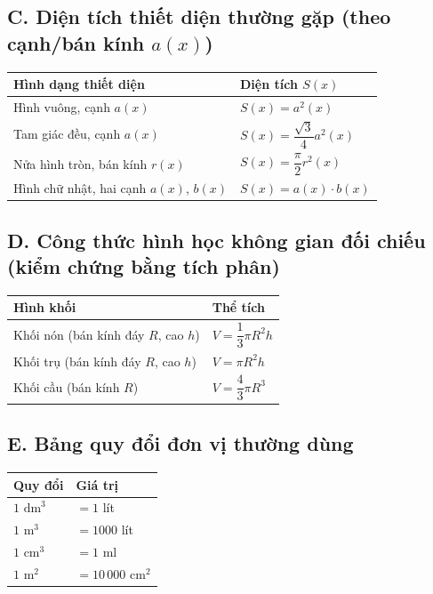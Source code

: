 \subsection*{C. Diện tích thiết diện thường gặp (theo cạnh/bán kính $a(x)$)}

\begin{hopdinhly}
\renewcommand{\arraystretch}{1.8}
\begin{tabular}{>{\raggedright\arraybackslash}p{5.5cm}>{\raggedright\arraybackslash}p{7.5cm}}
\textbf{Hình dạng thiết diện} & \textbf{Diện tích $S(x)$} \\
\hline
Hình vuông, cạnh $a(x)$ & $S(x)=a^2(x)$ \\
Tam giác đều, cạnh $a(x)$ & $S(x)=\dfrac{\sqrt3}{4}a^2(x)$ \\
Nửa hình tròn, bán kính $r(x)$ & $S(x)=\dfrac{\pi}{2}r^2(x)$ \\
Hình chữ nhật, hai cạnh $a(x)$, $b(x)$ & $S(x)=a(x)\cdot b(x)$ \\
\end{tabular}
\end{hopdinhly}

\subsection*{D. Công thức hình học không gian đối chiếu (kiểm chứng bằng tích phân)}

\begin{hopdinhly}
\renewcommand{\arraystretch}{1.8}
\begin{tabular}{>{\raggedright\arraybackslash}p{5.5cm}>{\raggedright\arraybackslash}p{7.5cm}}
\textbf{Hình khối} & \textbf{Thể tích} \\
\hline
Khối nón (bán kính đáy $R$, cao $h$) & $V=\dfrac13\pi R^2h$ \\
Khối trụ (bán kính đáy $R$, cao $h$) & $V=\pi R^2h$ \\
Khối cầu (bán kính $R$) & $V=\dfrac43\pi R^3$ \\
\end{tabular}
\end{hopdinhly}

\subsection*{E. Bảng quy đổi đơn vị thường dùng}

\begin{hopdinhly}
\renewcommand{\arraystretch}{1.6}
\begin{tabular}{>{\raggedright\arraybackslash}p{7cm}>{\raggedright\arraybackslash}p{6cm}}
\textbf{Quy đổi} & \textbf{Giá trị} \\
\hline
$1\text{ dm}^3$ & $=1$ lít \\
$1\text{ m}^3$ & $=1000$ lít \\
$1\text{ cm}^3$ & $=1$ ml \\
$1\text{ m}^2$ & $=10\,000\text{ cm}^2$ \\
\end{tabular}
\end{hopdinhly}

